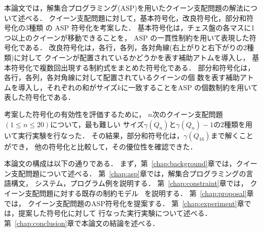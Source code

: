 本論文では，解集合プログラミング(ASP)を用いたクイーン支配問題の解法について述べる．
クイーン支配問題に対して，基本符号化，改良符号化，部分和符号化の3種類
の ASP 符号化を考案した．
%
基本符号化は，チェス盤の各マスに1つ以上のクイーンが移動できることを，
ASP の一貫性制約を用いて表現した符号化である．
%
改良符号化は，各行，各列，各対角線(右上がりと右下がりの2種類)に対して
クイーンが配置されているかどうかを表す補助アトムを導入し，
基本符号化で複数回出現する制約式をまとめた符号化である．
%
部分和符号化は，各行，各列，各対角線に対して配置されているクイーンの個
数を表す補助アトムを導入し，それぞれの和がサイズ$k$に一致することをASP
の個数制約を用いて表した符号化である．

考案した符号化の有効性を評価するために，
$n$次のクイーン支配問題 $(1\leq n\leq 20)$について，最も難しい
サイズ$\gamma(Q_n)$と$\gamma(Q_n)-1$の2種類を用いて実行実験を行なった．
その結果，部分和符号化は，$\gamma(Q_{16})$まで解くことができ，
他の符号化と比較して，その優位性を確認できた．

本論文の構成は以下の通りである．
まず，第~\ref{chap:background}章では，クイーン支配問題について述べる．
第~\ref{chap:asp}章では，解集合プログラミングの言語構文，
システム，プログラム例を説明する．
第~\ref{chap:constraint}章では，
クイーン支配問題に対する既存の制約モデル~\cite{yamamoto21}
を説明する．
第~\ref{chap:proposal}章では，
クイーン支配問題のASP符号化を提案する．
第~\ref{chap:experiment}章では，提案した符号化に対して
行なった実行実験について述べる．
第~\ref{chap:conclusion}章で本論文の結論を述べる．


